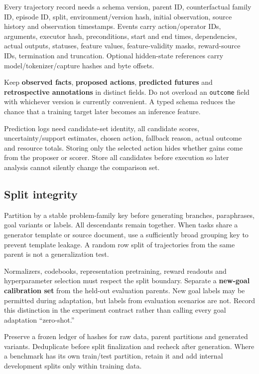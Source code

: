 \documentclass[
  11pt,
  a4paper,
]{article}
\begin{document}
Every trajectory record needs a schema version, parent ID,
counterfactual family ID, episode ID, split, environment/version hash,
initial observation, source history and observation timestamps. Events
carry action/operator IDs, arguments, executor hash, preconditions,
start and end times, dependencies, actual outputs, statuses, feature
values, feature-validity masks, reward-source IDs, termination and
truncation. Optional hidden-state references carry
model/tokenizer/capture hashes and byte offsets.

Keep \textbf{observed facts}, \textbf{proposed actions},
\textbf{predicted futures} and \textbf{retrospective annotations} in
distinct fields. Do not overload an \texttt{outcome} field with
whichever version is currently convenient. A typed schema reduces the
chance that a training target later becomes an inference feature.

Prediction logs need candidate-set identity, all candidate scores,
uncertainty/support estimates, chosen action, fallback reason, actual
outcome and resource totals. Storing only the selected action hides
whether gains come from the proposer or scorer. Store all candidates
before execution so later analysis cannot silently change the comparison
set.

\subsection{Split integrity}\label{split-integrity}

Partition by a stable problem-family key before generating branches,
paraphrases, goal variants or labels. All descendants remain together.
When tasks share a generator template or source document, use a
sufficiently broad grouping key to prevent template leakage. A random
row split of trajectories from the same parent is not a generalization
test.

Normalizers, codebooks, representation pretraining, reward readouts and
hyperparameter selection must respect the split boundary. Separate a
\textbf{new-goal calibration set} from the held-out evaluation parents.
New goal labels may be permitted during adaptation, but labels from
evaluation scenarios are not. Record this distinction in the experiment
contract rather than calling every goal adaptation ``zero-shot.''

Preserve a frozen ledger of hashes for raw data, parent partitions and
generated variants. Deduplicate before split finalization and recheck
after generation. Where a benchmark has its own train/test partition,
retain it and add internal development splits only within training data.
\end{document}
